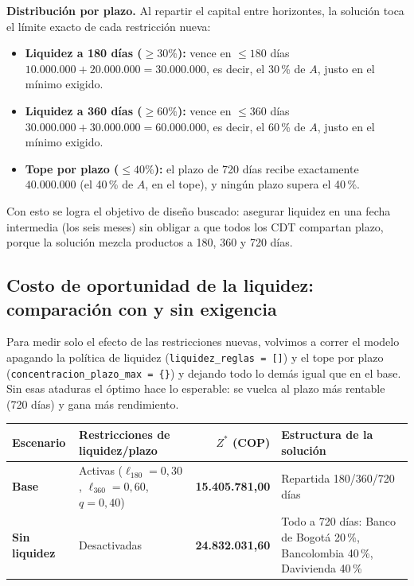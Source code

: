 \documentclass[11pt,a4paper]{article}
\begin{document}
\textbf{Distribución por plazo.} Al repartir el capital entre horizontes, la solución toca el
límite exacto de cada restricción nueva:

\begin{itemize}
  \item \textbf{Liquidez a 180 días ($\ge 30 \%$):} vence en $\le 180$ días
  $10.000.000 + 20.000.000 = 30.000.000$, es decir, el 30\,\% de $A$, justo en el
  mínimo exigido.
  \item \textbf{Liquidez a 360 días ($\ge 60 \%$):} vence en $\le 360$ días
  $30.000.000 + 30.000.000 = 60.000.000$, es decir, el 60\,\% de $A$, justo en el
  mínimo exigido.
  \item \textbf{Tope por plazo ($\le 40 \%$):} el plazo de 720 días recibe exactamente
  $40.000.000$ (el 40\,\% de $A$, en el tope), y ningún plazo supera el 40\,\%.
\end{itemize}

Con esto se logra el objetivo de diseño buscado: asegurar liquidez en una fecha
intermedia (los seis meses) sin obligar a que todos los CDT compartan plazo, porque la solución
mezcla productos a 180, 360 y 720 días.

\subsection{Costo de oportunidad de la liquidez: comparación con y sin exigencia}

Para medir solo el efecto de las restricciones nuevas, volvimos a correr el modelo apagando la
política de liquidez (\texttt{liquidez\_reglas = []}) y el tope por plazo
(\texttt{concentracion\_plazo\_max = \{\}}) y dejando todo lo demás igual que en el base. Sin
esas ataduras el óptimo hace lo esperable: se vuelca al plazo más rentable (720 días) y gana más
rendimiento.

\begin{center}
\small
\begin{tabularx}{\textwidth}{l L r L}
\toprule
Escenario & Restricciones de liquidez/plazo & $Z^*$ (COP) & Estructura de la solución \\
\midrule
\textbf{Base} & Activas ($\ell_{180}=0{,}30$, $\ell_{360}=0{,}60$, $q=0{,}40$) & \textbf{15.405.781,00} & Repartida 180/360/720 días \\
\textbf{Sin liquidez} & Desactivadas & \textbf{24.832.031,60} & Todo a 720 días: Banco de Bogotá 20\,\%, Bancolombia 40\,\%, Davivienda 40\,\% \\
\bottomrule
\end{tabularx}
\end{center}
\end{document}
